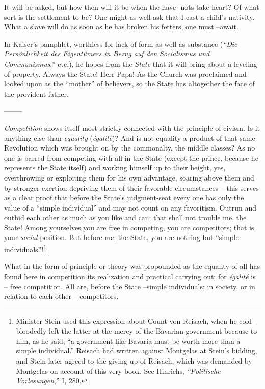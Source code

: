 It will be asked, but how then will it be when the have- nots take heart? Of 
what sort is the settlement to be? One might as well ask that I cast a child's 
nativity. What a slave will do as soon as he has broken his fetters, one must 
--await.

In Kaiser's pamphlet, worthless for lack of form as well as substance 
(\textit{``Die Pers\"onlichkeit des Eigent\"umers in Bezug auf den 
Socialismus und Communismus},'' etc.), he hopes from the \textit{State} that 
it will bring about a leveling of property. Always the State! Herr Papa! As 
the Church was proclaimed and looked upon as the ``mother'' of believers, so 
the State has altogether the face of the provident father.

\begin{center}
--------\end{center}


\textit{Competition} shows itself most strictly connected with the principle 
of civism. Is it anything else than \textit{equality} (\textit{\'egalit\'e})? 
And is not equality a product of that same Revolution which was brought on by 
the commonalty, the middle classes? As no one is barred from competing with 
all in the State (except the prince, because he represents the State itself) 
and working himself up to their height, yes, overthrowing or exploiting them 
for his own advantage, soaring above them and by stronger exertion depriving 
them of their favorable circumstances -- this serves as a clear proof that 
before the State's judgment-seat every one has only the value of a ``simple 
individual'' and may not count on any favoritism. Outrun and outbid each 
other as much as you like and can; that shall not trouble me, the State! Among 
yourselves you are free in competing, you are competitors; that is your 
\textit{social} position. But before me, the State, you are nothing but 
``simple individuals''!\footnote{Minister Stein used this expression about 
Count von Reisach, when he cold-bloodedly left the latter at the mercy of the 
Bavarian government because to him, as he said, ``a government like Bavaria 
must be worth more than a simple individual.'' Reisach had written against 
Montgelas at Stein's bidding, and Stein later agreed to the giving up of 
Reisach, which was demanded by Montgelas on account of this very book. See 
Hinrichs, \textit{``Politische Vorlesungen},'' I, 280.}

What in the form of principle or theory was propounded as the equality of all 
has found here in competition its realization and practical carrying out; for 
\textit{\'egalit\'e} is -- free competition. All are, before the State 
--simple individuals; in society, or in relation to each other -- competitors.

